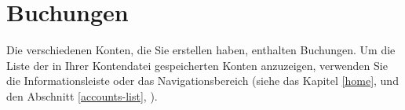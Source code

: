 
\chapter{Buchungen\label{transactions}}

Die verschiedenen Konten, die Sie erstellen haben, enthalten Buchungen. Um die Liste der in Ihrer Kontendatei gespeicherten Konten anzuzeigen, verwenden Sie die Informationsleiste oder das Navigationsbereich (siehe das Kapitel \vref{home},  und den Abschnitt \vref{accounts-list}, ).

